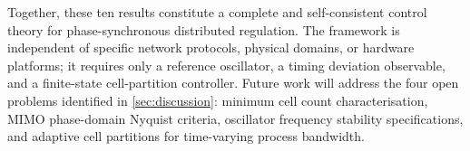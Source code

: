 \documentclass[10pt,twocolumn]{article}
\theoremstyle{plain}
\theoremstyle{definition}
\theoremstyle{remark}
\begin{document}
Together, these ten results constitute a complete and self-consistent
control theory for phase-synchronous distributed regulation.  The
framework is independent of specific network protocols, physical domains,
or hardware platforms; it requires only a reference oscillator, a
timing deviation observable, and a finite-state cell-partition controller.
Future work will address the four open problems identified in
\cref{sec:discussion}: minimum cell count characterisation, MIMO
phase-domain Nyquist criteria, oscillator frequency stability
specifications, and adaptive cell partitions for time-varying process
bandwidth.



\end{document}
